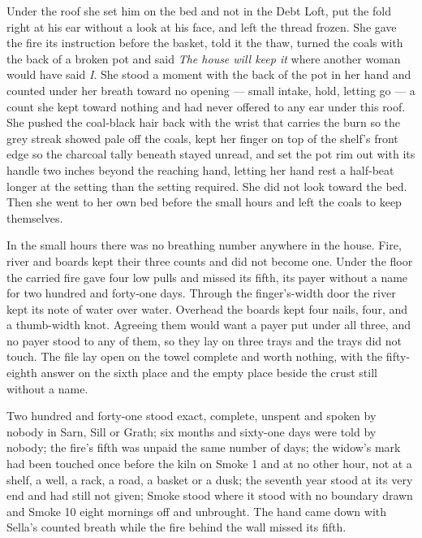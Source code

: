 Under the roof she set him on the bed and not in the Debt Loft, put the fold right at his ear without a look at his face, and left the thread frozen. She gave the fire its instruction before the basket, told it the thaw, turned the coals with the back of a broken pot and said \emph{The house will keep it} where another woman would have said \emph{I}. She stood a moment with the back of the pot in her hand and counted under her breath toward no opening --- small intake, hold, letting go --- a count she kept toward nothing and had never offered to any ear under this roof. She pushed the coal-black hair back with the wrist that carries the burn so the grey streak showed pale off the coals, kept her finger on top of the shelf's front edge so the charcoal tally beneath stayed unread, and set the pot rim out with its handle two inches beyond the reaching hand, letting her hand rest a half-beat longer at the setting than the setting required. She did not look toward the bed. Then she went to her own bed before the small hours and left the coals to keep themselves.

In the small hours there was no breathing number anywhere in the house. Fire, river and boards kept their three counts and did not become one. Under the floor the carried fire gave four low pulls and missed its fifth, its payer without a name for two hundred and forty-one days. Through the finger's-width door the river kept its note of water over water. Overhead the boards kept four nails, four, and a thumb-width knot. Agreeing them would want a payer put under all three, and no payer stood to any of them, so they lay on three trays and the trays did not touch. The file lay open on the towel complete and worth nothing, with the fifty-eighth answer on the sixth place and the empty place beside the crust still without a name.

Two hundred and forty-one stood exact, complete, unspent and spoken by nobody in Sarn, Sill or Grath; six months and sixty-one days were told by nobody; the fire's fifth was unpaid the same number of days; the widow's mark had been touched once before the kiln on Smoke 1 and at no other hour, not at a shelf, a well, a rack, a road, a basket or a dusk; the seventh year stood at its very end and had still not given; Smoke stood where it stood with no boundary drawn and Smoke 10 eight mornings off and unbrought. The hand came down with Sella's counted breath while the fire behind the wall missed its fifth.
